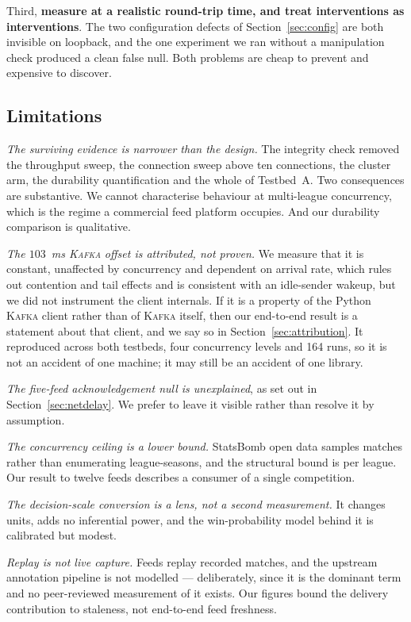 \documentclass[Afour,sageh,times]{sagej}
\newcommand{\kafka}{\textsc{Kafka}}
\begin{document}
Third, \textbf{measure at a realistic round-trip time, and treat interventions as interventions}.
The two configuration defects of Section~\ref{sec:config} are both invisible on loopback, and the
one experiment we ran without a manipulation check produced a clean false null. Both problems are
cheap to prevent and expensive to discover.

\subsection{Limitations}
\label{sec:limitations}

\emph{The surviving evidence is narrower than the design.} The integrity check removed the
throughput sweep, the connection sweep above ten connections, the cluster arm, the durability
quantification and the whole of Testbed~A. Two consequences are substantive. We cannot characterise
behaviour at multi-league concurrency, which is the regime a commercial feed platform occupies.
And our durability comparison is qualitative.

\emph{The $103$~ms \kafka{} offset is attributed, not proven.} We measure that it is constant,
unaffected by concurrency and dependent on arrival rate, which rules out contention and tail
effects and is consistent with an idle-sender wakeup, but we did not instrument the client
internals. If it is a property of the Python \kafka{} client rather than of \kafka{} itself, then
our end-to-end result is a statement about that client, and we say so in
Section~\ref{sec:attribution}. It reproduced across both testbeds, four concurrency levels and 164
runs, so it is not an accident of one machine; it may still be an accident of one library.

\emph{The five-feed acknowledgement null is unexplained}, as set out in
Section~\ref{sec:netdelay}. We prefer to leave it visible rather than resolve it by assumption.

\emph{The concurrency ceiling is a lower bound.} StatsBomb open data samples matches rather than
enumerating league-seasons, and the structural bound is per league. Our result to twelve feeds
describes a consumer of a single competition.

\emph{The decision-scale conversion is a lens, not a second measurement.} It changes units, adds
no inferential power, and the win-probability model behind it is calibrated but modest.

\emph{Replay is not live capture.} Feeds replay recorded matches, and the upstream annotation
pipeline is not modelled --- deliberately, since it is the dominant term and no peer-reviewed
measurement of it exists. Our figures bound the delivery contribution to staleness, not end-to-end
feed freshness.
\end{document}
